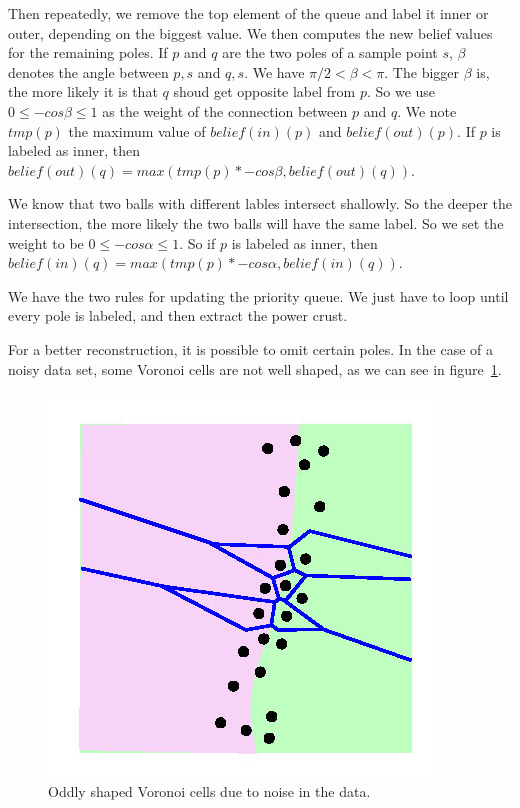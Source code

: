 \documentclass[a4paper]{article}
\begin{document}
Then repeatedly, we remove the top element of the queue and label it inner or outer, depending on the biggest value. We then computes the new belief values for the remaining poles. If $p$ and $q$ are the two poles of a sample point $s$, $\beta$ denotes the angle between $p,s$ and $q,s$. We have $\pi/2 < \beta < \pi$. The bigger $\beta$ is, the more likely it is that $q$ shoud get opposite label from $p$. So we use $0 \le -cos\beta \le 1$ as the weight of the connection between $p$ and $q$. We note $tmp(p)$ the maximum value of $belief(in)(p)$ and $belief(out)(p)$. If $p$ is labeled as inner, then $belief(out)(q) = max(tmp(p)*-cos\beta, belief(out)(q))$.

We know that two balls with different lables intersect shallowly. So the deeper the intersection, the more likely the two balls will have the same label. So we set the weight to be $0 \le -cos\alpha \le 1$. So if $p$ is labeled as inner, then $belief(in)(q) = max(tmp(p)*-cos\alpha, belief(in)(q))$.

We have the two rules for updating the priority queue. We just have to loop until every pole is labeled, and then extract the power crust.

For a better reconstruction, it is possible to omit certain poles. In the case of a noisy data set, some Voronoi cells are not well shaped, as we can see in figure~\ref{noisePC}.
\begin{figure}[h]
  \centering
  \includegraphics[scale=0.3]{noise.jpg}
  \caption{\label{noisePC} Oddly shaped Voronoi cells due to noise in the data.}
\end{figure}
\end{document}
